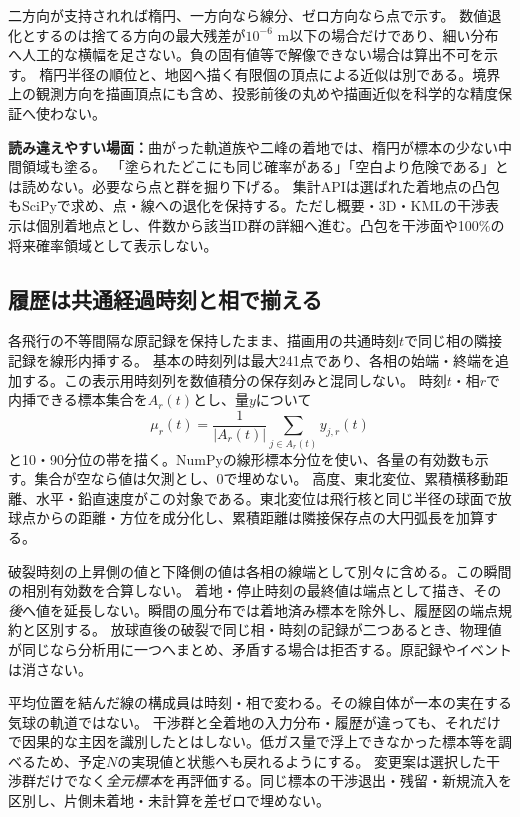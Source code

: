 \documentclass[11pt,a4paper]{article}
\begin{document}
二方向が支持されれば楕円、一方向なら線分、ゼロ方向なら点で示す。
数値退化とするのは捨てる方向の最大残差が$10^{-6}$ m以下の場合だけであり、細い分布へ人工的な横幅を足さない。負の固有値等で解像できない場合は算出不可を示す。
楕円半径の順位と、地図へ描く有限個の頂点による近似は別である。境界上の観測方向を描画頂点にも含め、投影前後の丸めや描画近似を科学的な精度保証へ使わない。

\textbf{読み違えやすい場面：}曲がった軌道族や二峰の着地では、楕円が標本の少ない中間領域も塗る。
「塗られたどこにも同じ確率がある」「空白より危険である」とは読めない。必要なら点と群を掘り下げる。
集計APIは選ばれた着地点の凸包もSciPyで求め、点・線への退化を保持する。ただし概要・3D・KMLの干渉表示は個別着地点とし、件数から該当ID群の詳細へ進む。凸包を干渉面や100\%の将来確率領域として表示しない。

\clearpage
\subsection{履歴は共通経過時刻と相で揃える}
各飛行の不等間隔な原記録を保持したまま、描画用の共通時刻$t$で同じ相の隣接記録を線形内挿する。
基本の時刻列は最大241点であり、各相の始端・終端を追加する。この表示用時刻列を数値積分の保存刻みと混同しない。
時刻$t$・相$r$で内挿できる標本集合を$A_r(t)$とし、量$y$について
\begin{equation}
 \mu_r(t)=\frac1{|A_r(t)|}\sum_{j\in A_r(t)}y_{j,r}(t)
\end{equation}
と10・90分位の帯を描く。NumPyの線形標本分位を使い、各量の有効数も示す。集合が空なら値は欠測とし、0で埋めない。
高度、東北変位、累積横移動距離、水平・鉛直速度がこの対象である。東北変位は飛行核と同じ半径の球面で放球点からの距離・方位を成分化し、累積距離は隣接保存点の大円弧長を加算する。

破裂時刻の上昇側の値と下降側の値は各相の線端として別々に含める。この瞬間の相別有効数を合算しない。
着地・停止時刻の最終値は端点として描き、その\emph{後}へ値を延長しない。瞬間の風分布では着地済み標本を除外し、履歴図の端点規約と区別する。
放球直後の破裂で同じ相・時刻の記録が二つあるとき、物理値が同じなら分析用に一つへまとめ、矛盾する場合は拒否する。原記録やイベントは消さない。

平均位置を結んだ線の構成員は時刻・相で変わる。その線自体が一本の実在する気球の軌道ではない。
干渉群と全着地の入力分布・履歴が違っても、それだけで因果的な主因を識別したとはしない。低ガス量で浮上できなかった標本等を調べるため、予定$N$の実現値と状態へも戻れるようにする。
変更案は選択した干渉群だけでなく\emph{全元標本}を再評価する。同じ標本の干渉退出・残留・新規流入を区別し、片側未着地・未計算を差ゼロで埋めない。
\end{document}
